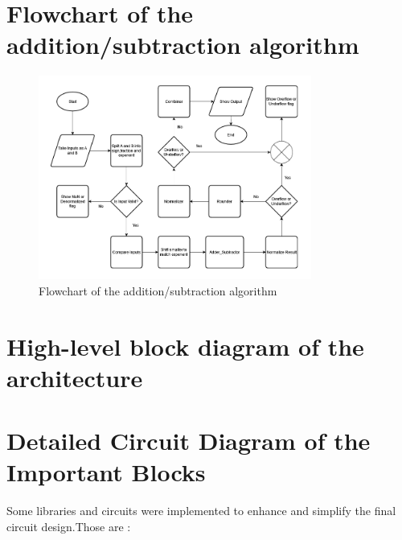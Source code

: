\documentclass[12pt]{article}
\begin{document}
\section{\large{Flowchart of the addition/subtraction algorithm}}
\vspace{15mm}
\begin{figure}[H]
	\centering
	\includegraphics[width=0.8\textwidth]{images/flowchart.png}
	\caption{ Flowchart of the addition/subtraction algorithm }
	\label{fig:enter-label}
\end{figure}





\newpage



\section{\large{High-level block diagram of the architecture}}





\newpage






\section{\large{Detailed Circuit Diagram of the Important Blocks}}
Some libraries and circuits were implemented to enhance and simplify the final circuit design.Those are :
\end{document}

